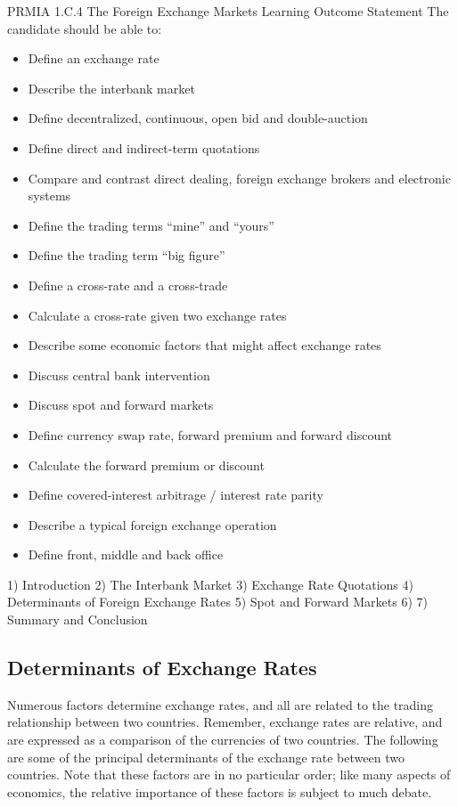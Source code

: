 PRMIA 1.C.4 The Foreign Exchange Markets
Learning Outcome Statement
The candidate should be able to:
\begin{itemize}	
\item	Define an exchange rate
\item	  Describe the interbank market
\item	  Define decentralized, continuous, open bid and double-auction
\item	  Define direct and indirect-term quotations
\item	  Compare and contrast direct dealing, foreign exchange brokers and electronic systems
\item	  Define the trading terms “mine” and “yours”
\item	  Define the trading term “big figure”
\item	  Define a cross-rate and a cross-trade
\item	  Calculate a cross-rate given two exchange rates
\item	  Describe some economic factors that might affect exchange rates
\item	  Discuss central bank intervention
\item	  Discuss spot and forward markets
\item	  Define currency swap rate, forward premium and forward discount
\item	  Calculate the forward premium or discount
\item	  Define covered-interest arbitrage / interest rate parity
\item	Describe a typical foreign exchange operation
\item	  Define front, middle and back office
\end{itemize}	

1) Introduction
2) The Interbank Market
3) Exchange Rate Quotations
4) Determinants of Foreign Exchange Rates
5) Spot and Forward Markets
6) 
7) Summary and Conclusion
\subsection*{Determinants of Exchange Rates}
Numerous factors determine exchange rates, and all are related to the trading relationship between two countries. Remember, exchange rates are relative, and are expressed as a comparison of the currencies of two countries. The following are some of the principal determinants of the exchange rate between two countries. Note that these factors are in no particular order; like many aspects of economics, the relative importance of these factors is subject to much debate.

